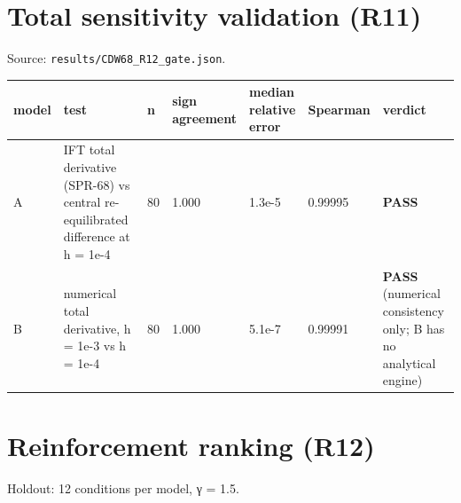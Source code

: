 \documentclass[10pt,a4paper]{article}
\begin{document}
\section{Total sensitivity validation (R11)}
Source: \texttt{results/\allowbreak{}CDW68\_\allowbreak{}R12\_\allowbreak{}gate.json}.

{\small
\begin{longtable}{L{0.060\linewidth}L{0.381\linewidth}L{0.060\linewidth}L{0.067\linewidth}L{0.101\linewidth}L{0.060\linewidth}L{0.313\linewidth}}
\toprule
\textbf{model} & \textbf{test} & \textbf{n} & \textbf{sign agreement} & \textbf{median relative error} & \textbf{Spearman} & \textbf{verdict} \\
\midrule
\endhead
A & IFT total derivative (SPR-68) vs central re-equilibrated difference at h = 1e-4 & 80 & 1.000 & 1.3e-5 & 0.99995 & \textbf{PASS} \\
B & numerical total derivative, h = 1e-3 vs h = 1e-4 & 80 & 1.000 & 5.1e-7 & 0.99991 & \textbf{PASS} (numerical consistency only; B has no analytical engine) \\
\bottomrule
\end{longtable}}
\section{Reinforcement ranking (R12)}
Holdout: 12 conditions per model, γ = 1.5.
\end{document}
